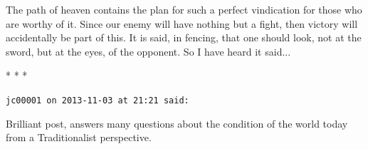 The path of heaven contains the plan for such a perfect vindication for those who are worthy of it. Since our enemy will have nothing but a fight, then victory will accidentally be part of this. It is said, in fencing, that one should look, not at the sword, but at the eyes, of the opponent. So I have heard it said... 


\begin{center}* * *\end{center}

\begin{footnotesize}
\begin{sffamily}
\texttt{jc00001 on 2013-11-03 at 21:21 said:}

Brilliant post, answers many questions about the condition of the world today from a Traditionalist perspective.


\hfill

\end{sffamily}
\end{footnotesize}

